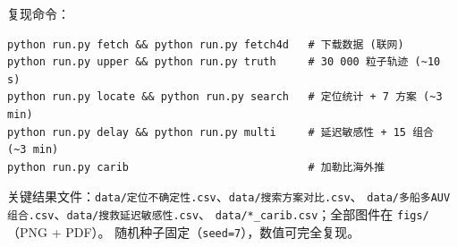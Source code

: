 \noindent 复现命令：
\begin{verbatim}
python run.py fetch && python run.py fetch4d   # 下载数据 (联网)
python run.py upper && python run.py truth     # 30 000 粒子轨迹 (~10 s)
python run.py locate && python run.py search   # 定位统计 + 7 方案 (~3 min)
python run.py delay && python run.py multi     # 延迟敏感性 + 15 组合 (~3 min)
python run.py carib                            # 加勒比海外推
\end{verbatim}

\noindent 关键结果文件：\texttt{data/定位不确定性.csv}、\texttt{data/搜索方案对比.csv}、
\texttt{data/多船多AUV组合.csv}、\texttt{data/搜救延迟敏感性.csv}、
\texttt{data/*\_carib.csv}；全部图件在 \texttt{figs/}（PNG + PDF）。
随机种子固定（\texttt{seed=7}），数值可完全复现。

